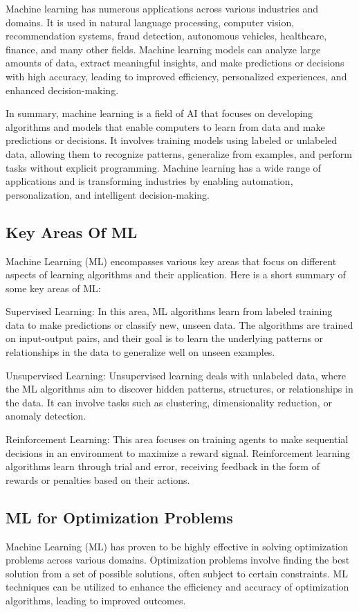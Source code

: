 Machine learning has numerous applications across various industries and domains. It is used in natural language processing, computer vision, recommendation systems, fraud detection, autonomous vehicles, healthcare, finance, and many other fields. Machine learning models can analyze large amounts of data, extract meaningful insights, and make predictions or decisions with high accuracy, leading to improved efficiency, personalized experiences, and enhanced decision-making.

In summary, machine learning is a field of AI that focuses on developing algorithms and models that enable computers to learn from data and make predictions or decisions. It involves training models using labeled or unlabeled data, allowing them to recognize patterns, generalize from examples, and perform tasks without explicit programming. Machine learning has a wide range of applications and is transforming industries by enabling automation, personalization, and intelligent decision-making.


\subsection{Key Areas Of ML}

Machine Learning (ML) encompasses various key areas that focus on different aspects of learning algorithms and their application. Here is a short summary of some key areas of ML:


Supervised Learning: In this area, ML algorithms learn from labeled training data to make predictions or classify new, unseen data. The algorithms are trained on input-output pairs, and their goal is to learn the underlying patterns or relationships in the data to generalize well on unseen examples.


Unsupervised Learning: Unsupervised learning deals with unlabeled data, where the ML algorithms aim to discover hidden patterns, structures, or relationships in the data. It can involve tasks such as clustering, dimensionality reduction, or anomaly detection.


Reinforcement Learning: This area focuses on training agents to make sequential decisions in an environment to maximize a reward signal. Reinforcement learning algorithms learn through trial and error, receiving feedback in the form of rewards or penalties based on their actions.


\subsection{ML for Optimization Problems}
Machine Learning (ML) has proven to be highly effective in solving optimization problems across various domains. Optimization problems involve finding the best solution from a set of possible solutions, often subject to certain constraints. ML techniques can be utilized to enhance the efficiency and accuracy of optimization algorithms, leading to improved outcomes.

